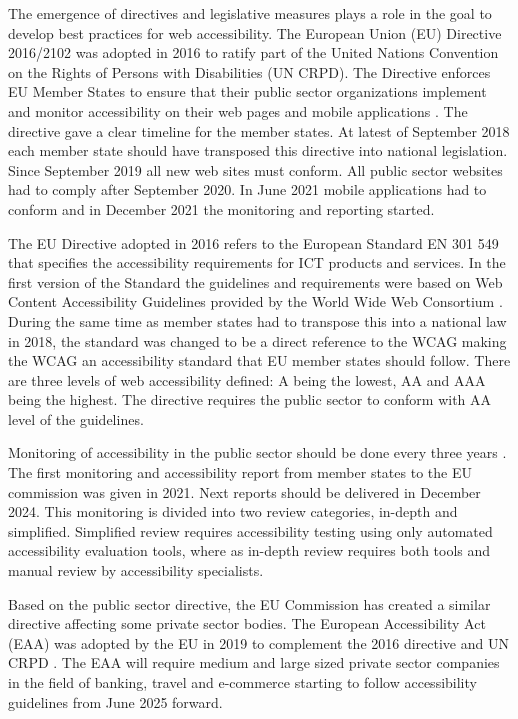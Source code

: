 The emergence of directives and legislative measures plays a role in the goal to develop best practices for web accessibility. The European Union (EU) Directive 2016/2102 was adopted in 2016 to ratify part of the United Nations Convention on the Rights of Persons with Disabilities (UN CRPD). The Directive enforces EU Member States to ensure that their public sector organizations implement and monitor accessibility on their web pages and mobile applications \citep{eudirective2016}. The directive gave a clear timeline for the member states. At latest of September 2018 each member state should have transposed this directive into national legislation. Since September 2019 all new web sites must conform. All public sector websites had to comply after September 2020. In June 2021 mobile applications had to conform and in December 2021 the monitoring and reporting started. 

The EU Directive adopted in 2016 refers to the European Standard EN 301 549 that specifies the accessibility requirements for ICT products and services. In the first version of the Standard the guidelines and requirements were based on Web Content Accessibility Guidelines provided by the World Wide Web Consortium \citep{wcagadoptioneurope}. During the same time as member states had to transpose this into a national law in 2018, the standard was changed to be a direct reference to the WCAG making the WCAG an accessibility standard that EU member states should follow. There are three levels of web accessibility defined: A being the lowest, AA and AAA being the highest. The directive requires the public sector to conform with AA level of the guidelines.

Monitoring of accessibility in the public sector should be done every three years \citep{eudirectivemonitoring}. The first monitoring and accessibility report from member states to the EU commission was given in 2021. Next reports should be delivered in December 2024. This monitoring is divided into two review categories, in-depth and simplified. Simplified review requires accessibility testing using only automated accessibility evaluation tools, where as in-depth review requires both tools and manual review by accessibility specialists. 

Based on the public sector directive, the EU Commission has created a similar directive affecting some private sector bodies. The European Accessibility Act (EAA) was adopted by the EU in 2019 to complement the 2016 directive and UN CRPD \citep{eudirective2019}. The EAA will require medium and large sized private sector companies in the field of banking, travel and e-commerce starting to follow accessibility guidelines from June 2025 forward.


